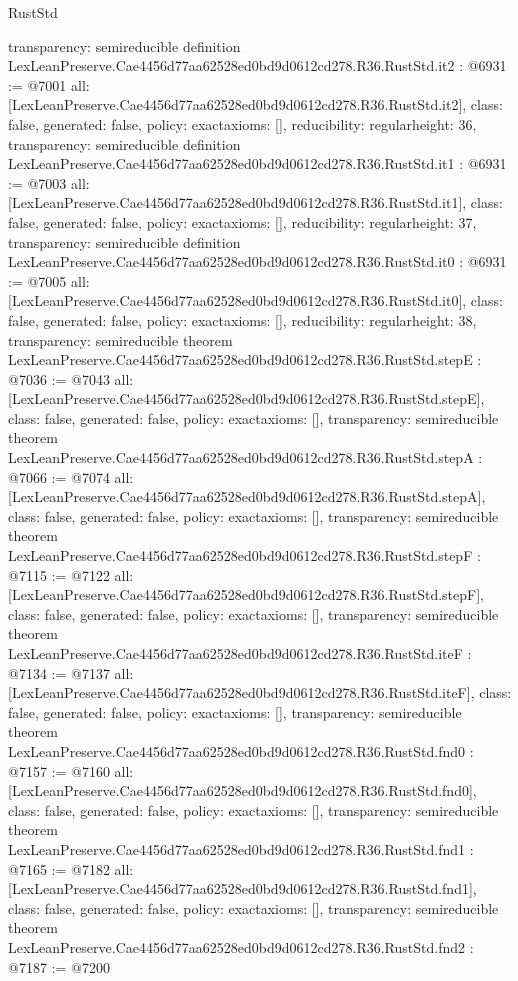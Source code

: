 \begin{lexlean}{RustStd}
\begin{coremodule}
{  transparency: semireducible
}
definition LexLeanPreserve.Cae4456d77aa62528ed0bd9d0612cd278.R36.RustStd.it2 : @6931 := @7001 {
  all: [LexLeanPreserve.Cae4456d77aa62528ed0bd9d0612cd278.R36.RustStd.it2],
  class: false,
  generated: false,
  policy: exact{axioms: []},
  reducibility: regular{height: 36},
  transparency: semireducible
}
definition LexLeanPreserve.Cae4456d77aa62528ed0bd9d0612cd278.R36.RustStd.it1 : @6931 := @7003 {
  all: [LexLeanPreserve.Cae4456d77aa62528ed0bd9d0612cd278.R36.RustStd.it1],
  class: false,
  generated: false,
  policy: exact{axioms: []},
  reducibility: regular{height: 37},
  transparency: semireducible
}
definition LexLeanPreserve.Cae4456d77aa62528ed0bd9d0612cd278.R36.RustStd.it0 : @6931 := @7005 {
  all: [LexLeanPreserve.Cae4456d77aa62528ed0bd9d0612cd278.R36.RustStd.it0],
  class: false,
  generated: false,
  policy: exact{axioms: []},
  reducibility: regular{height: 38},
  transparency: semireducible
}
theorem LexLeanPreserve.Cae4456d77aa62528ed0bd9d0612cd278.R36.RustStd.stepE : @7036 := @7043 {
  all: [LexLeanPreserve.Cae4456d77aa62528ed0bd9d0612cd278.R36.RustStd.stepE],
  class: false,
  generated: false,
  policy: exact{axioms: []},
  transparency: semireducible
}
theorem LexLeanPreserve.Cae4456d77aa62528ed0bd9d0612cd278.R36.RustStd.stepA : @7066 := @7074 {
  all: [LexLeanPreserve.Cae4456d77aa62528ed0bd9d0612cd278.R36.RustStd.stepA],
  class: false,
  generated: false,
  policy: exact{axioms: []},
  transparency: semireducible
}
theorem LexLeanPreserve.Cae4456d77aa62528ed0bd9d0612cd278.R36.RustStd.stepF : @7115 := @7122 {
  all: [LexLeanPreserve.Cae4456d77aa62528ed0bd9d0612cd278.R36.RustStd.stepF],
  class: false,
  generated: false,
  policy: exact{axioms: []},
  transparency: semireducible
}
theorem LexLeanPreserve.Cae4456d77aa62528ed0bd9d0612cd278.R36.RustStd.iteF : @7134 := @7137 {
  all: [LexLeanPreserve.Cae4456d77aa62528ed0bd9d0612cd278.R36.RustStd.iteF],
  class: false,
  generated: false,
  policy: exact{axioms: []},
  transparency: semireducible
}
theorem LexLeanPreserve.Cae4456d77aa62528ed0bd9d0612cd278.R36.RustStd.fnd0 : @7157 := @7160 {
  all: [LexLeanPreserve.Cae4456d77aa62528ed0bd9d0612cd278.R36.RustStd.fnd0],
  class: false,
  generated: false,
  policy: exact{axioms: []},
  transparency: semireducible
}
theorem LexLeanPreserve.Cae4456d77aa62528ed0bd9d0612cd278.R36.RustStd.fnd1 : @7165 := @7182 {
  all: [LexLeanPreserve.Cae4456d77aa62528ed0bd9d0612cd278.R36.RustStd.fnd1],
  class: false,
  generated: false,
  policy: exact{axioms: []},
  transparency: semireducible
}
theorem LexLeanPreserve.Cae4456d77aa62528ed0bd9d0612cd278.R36.RustStd.fnd2 : @7187 := @7200 {
}
\end{coremodule}
\end{lexlean}
